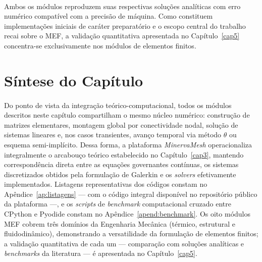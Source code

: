 \paragraph{}Ambos os módulos reproduzem suas respectivas soluções analíticas com erro numérico compatível com a precisão de máquina. Como constituem implementações iniciais de caráter preparatório e o escopo central do trabalho recai sobre o MEF, a validação quantitativa apresentada no Capítulo~\ref{cap5} concentra-se exclusivamente nos módulos de elementos finitos.

\section{Síntese do Capítulo}
\label{sec:sintese_implementacao}

\paragraph{}Do ponto de vista da integração teórico-computacional, todos os módulos descritos neste capítulo compartilham o mesmo núcleo numérico: construção de matrizes elementares, montagem global por conectividade nodal, solução de sistemas lineares e, nos casos transientes, avanço temporal via método $\theta$ ou esquema semi-implícito. Dessa forma, a plataforma \textit{MinervaMesh} operacionaliza integralmente o arcabouço teórico estabelecido no Capítulo~\ref{cap3}, mantendo correspondência direta entre as equações governantes contínuas, os sistemas discretizados obtidos pela formulação de Galerkin e os \textit{solvers} efetivamente implementados. Listagens representativas dos códigos constam no Apêndice~\ref{ap:listagens} --- com o código integral disponível no repositório público da plataforma ---, e os \textit{scripts} de \textit{benchmark} computacional cruzado entre CPython e Pyodide constam no Apêndice~\ref{apend:benchmark}. Os oito módulos MEF cobrem três domínios da Engenharia Mecânica (térmico, estrutural e fluidodinâmico), demonstrando a versatilidade da formulação de elementos finitos; a validação quantitativa de cada um --- comparação com soluções analíticas e \textit{benchmarks} da literatura --- é apresentada no Capítulo~\ref{cap5}.
